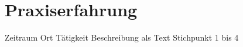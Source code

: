 

\section*{Praxiserfahrung}

\medskip

\experience%
	{Zeitraum}
	{}
	{Ort}
	{Tätigkeit}
	{Beschreibung als Text}
	{Stichpunkt 1 bis 4}
	{}
	{}
	{}

	